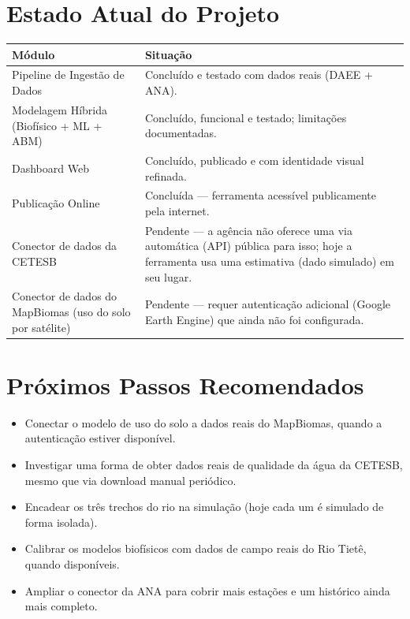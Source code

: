 \documentclass[11pt,a4paper]{article}
\begin{document}
\section{Estado Atual do Projeto}

\begin{center}
\begin{longtable}{p{4cm}p{10.5cm}}
\toprule
\textbf{Módulo} & \textbf{Situação} \\
\midrule
\endhead
Pipeline de Ingestão de Dados & Concluído e testado com dados reais (DAEE + ANA). \\
Modelagem Híbrida (Biofísico + ML + ABM) & Concluído, funcional e testado; limitações documentadas. \\
Dashboard Web & Concluído, publicado e com identidade visual refinada. \\
Publicação Online & Concluída — ferramenta acessível publicamente pela internet. \\
Conector de dados da CETESB & Pendente — a agência não oferece uma via automática (API) pública para isso; hoje a ferramenta usa uma estimativa (dado simulado) em seu lugar. \\
Conector de dados do MapBiomas (uso do solo por satélite) & Pendente — requer autenticação adicional (Google Earth Engine) que ainda não foi configurada. \\
\bottomrule
\end{longtable}
\end{center}

\section{Próximos Passos Recomendados}

\begin{itemize}
\item Conectar o modelo de uso do solo a dados reais do MapBiomas, quando a autenticação estiver disponível.
\item Investigar uma forma de obter dados reais de qualidade da água da CETESB, mesmo que via download manual periódico.
\item Encadear os três trechos do rio na simulação (hoje cada um é simulado de forma isolada).
\item Calibrar os modelos biofísicos com dados de campo reais do Rio Tietê, quando disponíveis.
\item Ampliar o conector da ANA para cobrir mais estações e um histórico ainda mais completo.
\end{itemize}
\end{document}
